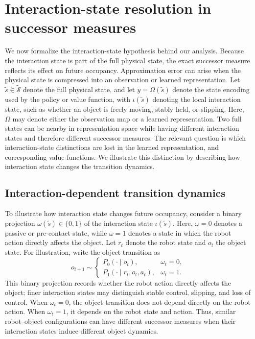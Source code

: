 \section{Interaction-state resolution in successor measures}
\label{sec:theory}

We now formalize the interaction-state hypothesis behind our analysis.
Because the interaction state is part of the full physical state, the exact successor measure reflects its effect on future occupancy.
Approximation error can arise when the physical state is compressed into an observation or learned representation.
Let $\tilde{s}\in\widetilde{\mathcal S}$ denote the full physical state, and let $y=\Omega(\tilde{s})$ denote the state encoding used by the policy or value function, with $\iota(\tilde{s})$ denoting the local interaction state, such as whether an object is freely moving, stably held, or slipping.
Here, $\Omega$ may denote either the observation map or a learned representation.
Two full states can be nearby in representation space while having different interaction states and therefore different successor measures.
The relevant question is which interaction-state distinctions are lost in the learned representation, and corresponding value-functions.
We illustrate this distinction by describing how interaction state changes the transition dynamics.

\subsection{Interaction-dependent transition dynamics}

To illustrate how interaction state changes future occupancy, consider a binary projection $\omega(\tilde{s})\in\{0,1\}$ of the interaction state $\iota(\tilde{s})$.
Here, $\omega=0$ denotes a passive or pre-contact state, while $\omega=1$ denotes a state in which the robot action directly affects the object.
Let $r_t$ denote the robot state and $o_t$ the object state.
For illustration, write the object transition as
\begin{equation}
    o_{t+1}
    \sim
    \begin{cases}
        P_0(\cdot\mid o_t), & \omega_t=0,\\
        P_1(\cdot\mid r_t,o_t,a_t), & \omega_t=1.
    \end{cases}
    \label{eq:mode_switch_target}
\end{equation}
This binary projection records whether the robot action directly affects the object; finer interaction states may distinguish stable control, slipping, and loss of control.
When $\omega_t=0$, the object transition does not depend directly on the robot action.
When $\omega_t=1$, it depends on the robot state and action.
Thus, similar robot--object configurations can have different successor measures when their interaction states induce different object dynamics.

